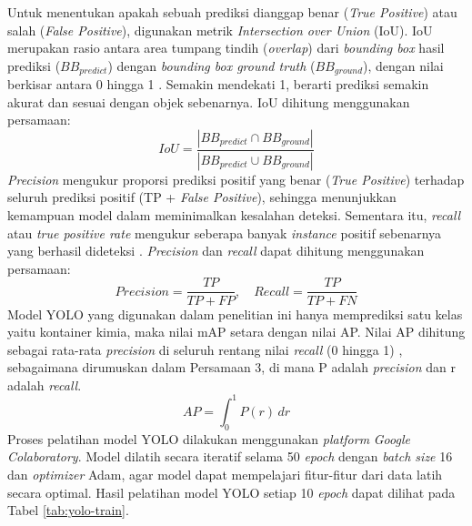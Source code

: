 Untuk menentukan apakah sebuah prediksi dianggap benar (\textit{True
Positive}) atau salah (\textit{False Positive}), digunakan metrik
\textit{Intersection over Union} (IoU). IoU merupakan rasio antara area
tumpang tindih (\textit{overlap}) dari \textit{bounding box} hasil prediksi
($BB_{predict}$) dengan
\textit{bounding box ground truth} ($BB_{ground}$), dengan nilai berkisar antara
0 hingga 1 \citep{22}.
Semakin mendekati 1, berarti prediksi semakin akurat dan sesuai
dengan objek sebenarnya. IoU dihitung menggunakan persamaan:
\begin{equation}
  IoU = \frac{|BB_{predict} \cap
  BB_{ground}|}{|BB_{predict} \cup BB_{ground}|}
\end{equation}
\indent
\textit{Precision} mengukur proporsi prediksi positif yang benar (\textit{True
Positive}) terhadap seluruh prediksi positif (TP + \textit{False
Positive}), sehingga menunjukkan kemampuan model dalam meminimalkan kesalahan
deteksi. Sementara itu, \textit{recall} atau \textit{true positive
rate} mengukur seberapa banyak \textit{instance} positif sebenarnya yang
berhasil dideteksi \citep{23}. \textit{Precision} dan
\textit{recall} dapat dihitung menggunakan persamaan:
\begin{equation}
  Precision = \frac{TP}{TP + FP}, \quad
  Recall = \frac{TP}{TP + FN}
\end{equation}
Model YOLO yang digunakan dalam penelitian ini hanya
memprediksi satu kelas yaitu kontainer kimia, maka nilai mAP setara
dengan nilai AP. Nilai AP dihitung sebagai rata-rata
\textit{precision} di seluruh
rentang nilai \textit{recall} (0 hingga 1) \citep{24}, sebagaimana
dirumuskan dalam
Persamaan 3, di mana P adalah \textit{precision} dan r adalah \textit{recall}.
\begin{equation}
  AP = \int_{0}^{1} P(r) \,dr
\end{equation}
\indent
Proses pelatihan model YOLO dilakukan menggunakan \textit{platform}
\textit{Google
Colaboratory}. Model dilatih secara iteratif selama 50 \textit{epoch} dengan
\textit{batch size} 16 dan \textit{optimizer} Adam, agar model dapat mempelajari
fitur-fitur dari data latih secara optimal. Hasil pelatihan model
YOLO setiap 10 \textit{epoch} dapat dilihat pada Tabel \ref{tab:yolo-train}.
